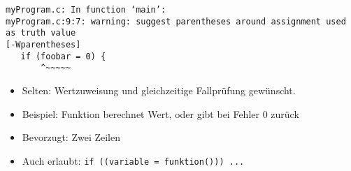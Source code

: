 \begin{frame}[fragile]
%
\begin{cmdbox}
\begin{verbatim}
myProgram.c: In function ‘main’:
myProgram.c:9:7: warning: suggest parentheses around assignment used as truth value 
[-Wparentheses]
   if (foobar = 0) {
       ^~~~~~
\end{verbatim}
\end{cmdbox}
%
\begin{hintbox}
\begin{itemize}
\item Selten: Wertzuweisung und gleichzeitige Fallprüfung gewünscht.
\item Beispiel: Funktion berechnet Wert, oder gibt bei Fehler 0 zurück
\item Bevorzugt: Zwei Zeilen
\item Auch erlaubt: \newline
	\texttt{if ((variable = funktion())) ... }
\end{itemize}
\end{hintbox}
%
\end{frame}


